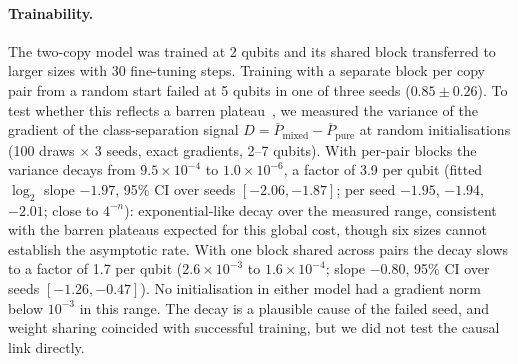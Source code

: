 \documentclass[11pt]{article}
\begin{document}
\begin{table}[h]
\centering
\small
{}
\caption{Copies of each test state needed to reach 90\% test accuracy, exact simulation, read off the power-of-two grid (the hardware comparison in Section~\ref{sec:quantum} instead interpolates on the hardware test states). ``Mean curve'': smallest grid value where accuracy averaged over three seeds is at least 0.9; ``per seed'': the same for each seed. The one-copy QNN never reaches 90\%.}
\label{tab:purity}
\end{table}

\paragraph{Trainability.} The two-copy model was trained at 2 qubits and its shared block transferred to larger sizes with 30 fine-tuning steps. Training with a separate block per copy pair from a random start failed at 5 qubits in one of three seeds ($0.85 \pm 0.26$). To test whether this reflects a barren plateau~\cite{mcclean2018barren,cerezo2021cost}, we measured the variance of the gradient of the class-separation signal $D = \overline{P}_{\text{mixed}} - \overline{P}_{\text{pure}}$ at random initialisations (100 draws $\times$ 3 seeds, exact gradients, 2--7 qubits). With per-pair blocks the variance decays from $9.5 \times 10^{-4}$ to $1.0 \times 10^{-6}$, a factor of 3.9 per qubit (fitted $\log_2$ slope $-1.97$, 95\% CI over seeds $[-2.06, -1.87]$; per seed $-1.95$, $-1.94$, $-2.01$; close to $4^{-n}$): exponential-like decay over the measured range, consistent with the barren plateaus expected for this global cost, though six sizes cannot establish the asymptotic rate. With one block shared across pairs the decay slows to a factor of 1.7 per qubit ($2.6 \times 10^{-3}$ to $1.6 \times 10^{-4}$; slope $-0.80$, 95\% CI over seeds $[-1.26, -0.47]$). No initialisation in either model had a gradient norm below $10^{-3}$ in this range. The decay is a plausible cause of the failed seed, and weight sharing coincided with successful training, but we did not test the causal link directly.
\end{document}
